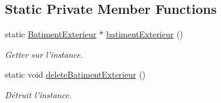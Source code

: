 \subsection*{Static Private Member Functions}
\begin{DoxyCompactItemize}
\item 
\hypertarget{classPropriete_1_1BatimentExterieur_a90456ca715ccf56bbe11b65bb50ca766}{static \hyperlink{classPropriete_1_1BatimentExterieur}{Batiment\-Exterieur} $\ast$ \hyperlink{classPropriete_1_1BatimentExterieur_a90456ca715ccf56bbe11b65bb50ca766}{batiment\-Exterieur} ()}\label{classPropriete_1_1BatimentExterieur_a90456ca715ccf56bbe11b65bb50ca766}

\begin{DoxyCompactList}\small\item\em Getter sur l'instance. \end{DoxyCompactList}\item 
\hypertarget{classPropriete_1_1BatimentExterieur_a7c3678011c1a18eb7e52731b768d4198}{static void \hyperlink{classPropriete_1_1BatimentExterieur_a7c3678011c1a18eb7e52731b768d4198}{delete\-Batiment\-Exterieur} ()}\label{classPropriete_1_1BatimentExterieur_a7c3678011c1a18eb7e52731b768d4198}

\begin{DoxyCompactList}\small\item\em Détruit l'instance. \end{DoxyCompactList}\end{DoxyCompactItemize}
